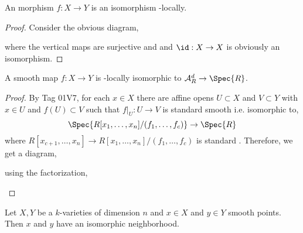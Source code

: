 \documentclass[12pt]{article}
\begin{document}
\begin{prop}
An \etale morphism $f: X \to Y$ is an isomorphism \etale-locally.
\end{prop}

\begin{proof}
Consider the obvious diagram,
\begin{center}
\end{center}
where the vertical maps are surjective and \etale and $\id : X \to X$ is obviously an isomorphism.
\end{proof}

\begin{prop}
A smooth map $f : X \to Y$ is \etale-locally isomorphic to $\A^d_R \to \Spec{R}$.
\end{prop}

\begin{proof}
By Tag 01V7, for each $x \in X$ there are affine opens $U \subset X$ and $V \subset Y$ with $x \in U$ and $f(U) \subset V$ such that $f|_U : U \to V$ is standard smooth i.e. isomorphic to,
\[ \Spec{R[x_1, \dots, x_n]/(f_1, \dots, f_c)} \to \Spec{R} \]
where $R[x_{c+1}, \dots, x_n] \to R[x_1, \dots, x_n]/(f_1, \dots, f_c)$ is standard \etale. Therefore, we get a diagram,
\begin{center}
\end{center}
using the factorization,
\begin{center}
\end{center}
\end{proof}

\begin{prop}
Let $X, Y$ be a $k$-varieties of dimension $n$ and $x \in X$ and $y \in Y$ smooth points. Then $x$ and $y$ have an isomorphic \etale neighborhood.
\end{prop}
\end{document}
